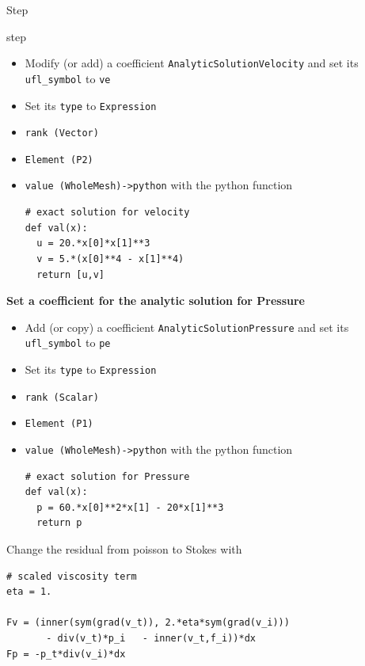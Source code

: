 \begin{steps}{Step}
\begin{steps}{step}
    \begin{itemize}
    \item Modify (or add) a coefficient
      \texttt{AnalyticSolutionVelocity} and set its
      \texttt{ufl\_symbol} to \texttt{ve}
    \item Set its \texttt{type} to \texttt{Expression}
    \item \texttt{rank (Vector)}
    \item \texttt{Element (P2)}
    \item \texttt{value (WholeMesh)->python} with the python function
      \begin{lstlisting}[style=Python]
# exact solution for velocity
def val(x):
  u = 20.*x[0]*x[1]**3
  v = 5.*(x[0]**4 - x[1]**4)
  return [u,v]
      \end{lstlisting}
    \end{itemize}
 \item \textbf{Set a coefficient for the analytic solution for Pressure}
    \begin{itemize}
    \item Add (or copy) a coefficient
      \texttt{AnalyticSolutionPressure} and set its
      \texttt{ufl\_symbol} to \texttt{pe}
    \item Set its \texttt{type} to \texttt{Expression}
    \item \texttt{rank (Scalar)}
    \item \texttt{Element (P1)}
    \item \texttt{value (WholeMesh)->python} with the python function
      \begin{lstlisting}[style=Python]
# exact solution for Pressure
def val(x):
  p = 60.*x[0]**2*x[1] - 20*x[1]**3
  return p
      \end{lstlisting}
    \end{itemize}
  \item Change the residual from poisson to Stokes with
    \begin{lstlisting}[style=UFL]
# scaled viscosity term
eta = 1.

Fv = (inner(sym(grad(v_t)), 2.*eta*sym(grad(v_i))) 
       - div(v_t)*p_i   - inner(v_t,f_i))*dx
Fp = -p_t*div(v_i)*dx


\end{lstlisting}
\end{steps}
\end{steps}
